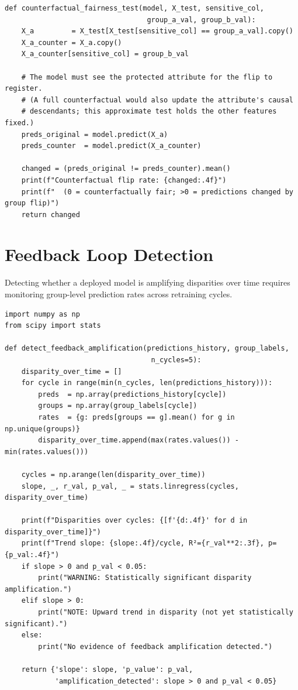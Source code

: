 \begin{lstlisting}[style=python, caption={Approximate counterfactual fairness test}]
def counterfactual_fairness_test(model, X_test, sensitive_col,
                                  group_a_val, group_b_val):
    X_a         = X_test[X_test[sensitive_col] == group_a_val].copy()
    X_a_counter = X_a.copy()
    X_a_counter[sensitive_col] = group_b_val

    # The model must see the protected attribute for the flip to register.
    # (A full counterfactual would also update the attribute's causal
    # descendants; this approximate test holds the other features fixed.)
    preds_original = model.predict(X_a)
    preds_counter  = model.predict(X_a_counter)

    changed = (preds_original != preds_counter).mean()
    print(f"Counterfactual flip rate: {changed:.4f}")
    print(f"  (0 = counterfactually fair; >0 = predictions changed by group flip)")
    return changed
\end{lstlisting}

\section{Feedback Loop Detection}
\label{sec:a14-feedback-loops}

Detecting whether a deployed model is amplifying disparities over time requires monitoring group-level prediction rates across retraining cycles.

\begin{lstlisting}[style=python, caption={Feedback loop amplification test}]
import numpy as np
from scipy import stats

def detect_feedback_amplification(predictions_history, group_labels,
                                   n_cycles=5):
    disparity_over_time = []
    for cycle in range(min(n_cycles, len(predictions_history))):
        preds  = np.array(predictions_history[cycle])
        groups = np.array(group_labels[cycle])
        rates  = {g: preds[groups == g].mean() for g in np.unique(groups)}
        disparity_over_time.append(max(rates.values()) - min(rates.values()))

    cycles = np.arange(len(disparity_over_time))
    slope, _, r_val, p_val, _ = stats.linregress(cycles, disparity_over_time)

    print(f"Disparities over cycles: {[f'{d:.4f}' for d in disparity_over_time]}")
    print(f"Trend slope: {slope:.4f}/cycle, R²={r_val**2:.3f}, p={p_val:.4f}")
    if slope > 0 and p_val < 0.05:
        print("WARNING: Statistically significant disparity amplification.")
    elif slope > 0:
        print("NOTE: Upward trend in disparity (not yet statistically significant).")
    else:
        print("No evidence of feedback amplification detected.")

    return {'slope': slope, 'p_value': p_val,
            'amplification_detected': slope > 0 and p_val < 0.05}
\end{lstlisting}


